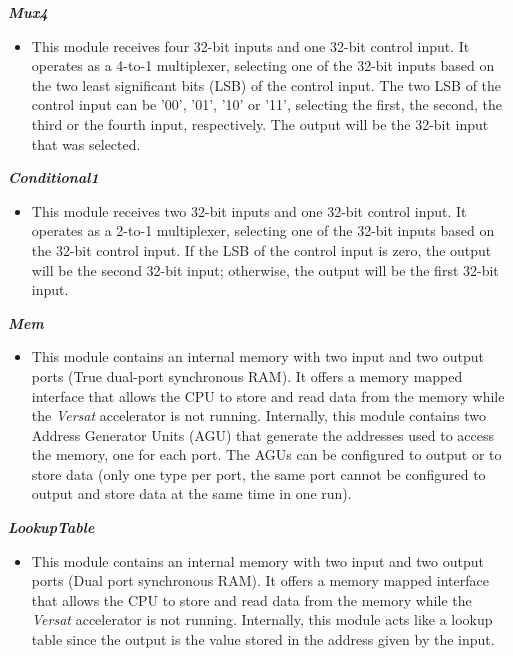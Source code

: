 \documentclass{article}
\begin{document}
\vspace{0.5cm}

\textbf{\textit{Mux4}}
\begin{itemize}
\item  This module receives four 32-bit inputs and one 32-bit control input. It operates as a 4-to-1 multiplexer, selecting one of the 32-bit inputs based on the two least significant bits (LSB) of the control input. 
The two LSB of the control input can be '00', '01', '10' or '11', selecting the first, the second, the third or the fourth input, respectively. The output will be the 32-bit input that was selected.
\end{itemize}

\vspace{0.5cm}

\textbf{\textit{Conditional1}}
\begin{itemize}
\item  This module receives two 32-bit inputs and one 32-bit control input. It operates as a 2-to-1 multiplexer, selecting one of the 32-bit inputs based on the 32-bit control input. 
If the LSB of the control input is zero, the output will be the second 32-bit input; otherwise, the output will be the first 32-bit input.
\end{itemize}

\vspace{0.5cm}

\textbf{\textit{Mem}}
\begin{itemize}
\item  This module contains an internal memory with two input and two output ports (True dual-port synchronous RAM). It offers a memory mapped interface that allows the CPU to store and read data from the memory while the \textit{Versat} accelerator is not running. 
Internally, this module contains two Address Generator Units (AGU) that generate the addresses used to access the memory, one for each port. The AGUs can be configured to output or to store data (only one type per port, the same port cannot be configured to output and store data at the same time in one run).
\end{itemize}

\vspace{0.5cm}

\textbf{\textit{LookupTable}}
\begin{itemize}
\item This module contains an internal memory with two input and two output ports (Dual port synchronous RAM). It offers a memory mapped interface that allows the CPU to store and read data from the memory while the \textit{Versat} accelerator is not running. 
Internally, this module acts like a lookup table since the output is the value stored in the address given by the input.
\end{itemize}
\end{document}
